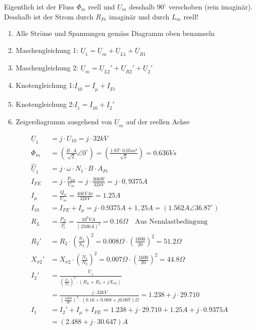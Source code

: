 \begin{minipage}{0.4\textwidth}
Eigentlich ist der Fluss $\Phi_m$ reell und $U_m$ desshalb  $90^\circ$ verschoben (rein imaginär). Desshalb ist der Strom durch $R_{Fe}$ imaginär und durch $L_m$ reell!
\begin{enumerate}
	\itemsep0em 
	\item Alle Ströme und Spannungen gemäss Diagramm oben benamseln
	\item Maschengleichung 1: $\underline{U}_1 = \underline{U}_m+\underline{U}_{L1}+\underline{U}_{R1}$
	\item Maschengleichung 2: $\underline{U}_m=\underline{U}_{L2}'+\underline{U}_{R2}'+\underline{U}_2'$
	\item Knotengleichung 1:$\underline{I}_{10} = \underline{I}_\mu + \underline{I}_{Fe}$
	\item Knotengleichung 2:$\underline{I}_1 = \underline{I}_{10}
+ \underline{I}_{2}'$
	\item Zeigerdiagramm ausgehend von $\underline{U}_m$ auf der reellen Achse
	
\end{enumerate}
\end{minipage}
\begin{minipage}{0.59\textwidth}
\begin{align*}
	\underline{U}_1 &= j\cdot U_{10} = j\cdot 32kV\\
	\Phi_m&= \left(\frac{B\cdot A}{\sqrt{2}}\angle 0^\circ\right) = \left(\frac{1.8T\cdot 0.05m^2}{\sqrt{2}}\right) = 0.636Vs\\
	\hat{\underline{U}}_1 &= j\cdot \omega \cdot N_1\cdot B\cdot A_{Fe}\\
	I_{FE} &= j\cdot\frac{P_{FE}}{U_m} =j\cdot\frac{30kW}{32kV}=j\cdot 0,9375A\\
	I_\mu &= \frac{Q_u}{U_m} = \frac{40kVAr}{32kV} = 1.25A\\
	I_{10}&=I_{FE}+I_{\mu} = j\cdot 0.9375A+1,25A = (1.562A\angle 36.87^\circ)\\
	R_L &= \frac{P_N}{I_2^2} = \frac{10^6 VA}{(2500 A)^2}= 0.16\Omega \quad \textrm{Aus Nennlastbedingung}\\
	R_2' &= R_2\cdot  \left(\frac{N_1}{N_2}\right)^2=0.008\Omega\cdot\left(\frac{1600}{20}\right)^2= 51.2\Omega\\
	X_{\sigma 2}' &=X_{\sigma 2}\cdot \left(\frac{N_1}{N_2}\right)^2=0.007\Omega\cdot\left(\frac{1600}{20}\right)^2=  44.8\Omega\\
	I_2'&= \frac{\underline{U}_1}{\left(\frac{N_1}{N_2}\right)^2\cdot \left(R_L+ R_2+jX_{\sigma 2}\right) }\\
	& = \frac{j\cdot 32kV }{\left(\frac{1600}{20}\right)^2\cdot \left(0.16+0.008+j 0.007\right)\Omega} = 1.238+j\cdot 29.710\\
	I_1&=I_2'+I_\mu+I_{FE} = 1.238+j\cdot 29.710+1.25A+j\cdot 0.9375A\\
	&= (2.488+j\cdot 30.647)A
\end{align*}
\end{minipage}
